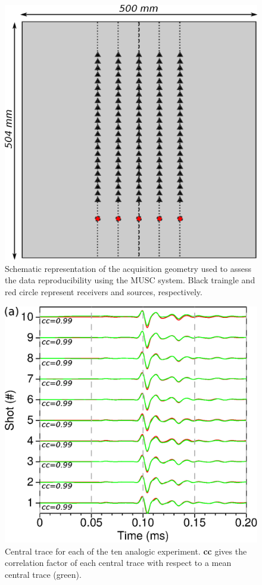 \documentclass[manuscript,revised]{geophysics}
\begin{document}
\begin{figure}[!h]
	\centering
	\includegraphics[scale=0.5]{fig/reproducibility_acqui_principle.eps}
	\caption{Schematic representation of the acquisition geometry used to assess the data reproducibility using the MUSC system. Black traingle and red circle represent receivers and sources, respectively.}
	\label{reproducibility_acqui_principle}
\end{figure}

\begin{figure}[!h]
	\centering
	\includegraphics[scale=0.5]{fig/musc_F50_CT.eps}
	\caption{Central trace for each of the ten analogic experiment. \textbf{cc} gives the correlation factor of each central trace with respect to a mean central trace (green).}
	\label{panel_central_traces_cc}
\end{figure}
\end{document}
